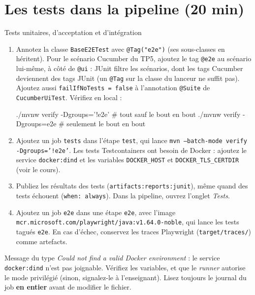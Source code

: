 \documentclass[11pt]{article}
\begin{document}
\section{Les tests dans la pipeline (20 min)}

\begin{exobox}{Tests unitaires, d'acceptation et d'intégration}
\begin{enumerate}[leftmargin=1.4em]
  \item Annotez la classe \texttt{BaseE2ETest} avec \texttt{@Tag("e2e")} (ses sous-classes en héritent). Pour le scénario Cucumber du TP5, ajoutez le tag \texttt{@e2e} au scénario lui-même, à côté de \texttt{@ui} : JUnit filtre les scénarios, dont les tags Cucumber deviennent des tags JUnit (un \texttt{@Tag} sur la classe du lanceur ne suffit pas). Ajoutez aussi \texttt{failIfNoTests = false} à l'annotation \texttt{@Suite} de \texttt{CucumberUiTest}. Vérifiez en local :
\begin{codebox}
./mvnw verify -Dgroups='!e2e'     # tout sauf le bout en bout
./mvnw verify -Dgroups=e2e        # seulement le bout en bout
\end{codebox}
  \item Ajoutez un job \texttt{tests} dans l'étape \texttt{test}, qui lance \texttt{mvn --batch-mode verify -Dgroups='!e2e'}. Les tests Testcontainers ont besoin de Docker : ajoutez le service \texttt{docker:dind} et les variables \texttt{DOCKER\_HOST} et \texttt{DOCKER\_TLS\_CERTDIR} (voir le cours).
  \item Publiez les résultats des tests (\texttt{artifacts:reports:junit}), même quand des tests échouent (\texttt{when: always}). Dans la pipeline, ouvrez l'onglet \textit{Tests}.
  \item Ajoutez un job \texttt{e2e} dans une étape \texttt{e2e}, avec l'image \texttt{mcr.microsoft.com/playwright/java:v1.64.0-noble}, qui lance les tests tagués \texttt{e2e}. En cas d'échec, conservez les traces Playwright (\texttt{target/traces/}) comme artefacts.
\end{enumerate}
\end{exobox}

\begin{infobox}
Message du type \textit{Could not find a valid Docker environment} : le service \texttt{docker:dind} n'est pas joignable. Vérifiez les variables, et que le \textit{runner} autorise le mode privilégié (sinon, signalez-le à l'enseignant). Lisez toujours le journal du job \textbf{en entier} avant de modifier le fichier.
\end{infobox}
\end{document}
